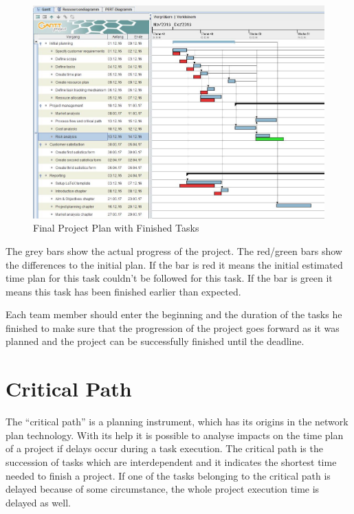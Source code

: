 \begin{figure}
  \centering
     \includegraphics[width=1\textwidth]
     {res/projectPlan/Tracking.JPG}
     \captionsetup{justification=centering}
  \caption{Final Project Plan with Finished Tasks}
  \label{fig:project plan with finished tasks}
\end{figure}

The grey bars show the actual progress of the project. The red/green bars show
the differences to the initial plan. If the bar is red it means the initial
estimated time plan for this task couldn't be followed for this task. If the bar
is green it means this task has been finished earlier than expected.

Each team member should enter the beginning and the duration of the tasks he
finished to make sure that the progression of the project goes forward as it was
planned and the project can be successfully finished until the deadline.


\section{Critical Path}

The ``critical path'' is a planning instrument, which has its origins in the
network plan technology. With its help it is possible to analyse impacts on the
time plan of a project if delays occur during a task execution. The critical
path is the succession of tasks which are interdependent and it indicates the
shortest time needed to finish a project. If one of the tasks belonging to the
critical path is delayed because of some circumstance, the whole project
execution time is delayed as well.

